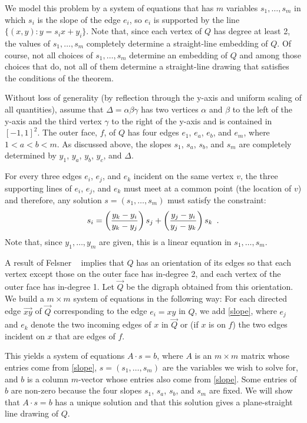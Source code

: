 \documentclass{patmorin}
\begin{document}
We model this problem by a system of equations that has $m$ variables
$s_1,\ldots,s_m$ in which $s_i$ is the slope of the edge $e_i$, so $e_i$
is supported by the line $\{(x,y):y=s_ix + y_i\}$.  Note that, since
each vertex of $Q$ has degree at least 2, the values of $s_1,\ldots,s_m$
completely determine a straight-line embedding of $Q$.  Of course,
not all choices of $s_1,\ldots,s_m$ determine an embedding of $Q$ and
among those choices that do, not all of them determine a straight-line
drawing that satisfies the conditions of the theorem.

Without loss of generality (by reflection through the y-axis and uniform
scaling of all quantities), assume that $\Delta=\alpha\beta\gamma$
has two vertices $\alpha$ and $\beta$ to the left of the y-axis and
the third vertex $\gamma$ to the right of the y-axis and is contained
in $[-1,1]^2$.  The outer face, $f$, of $Q$ has four edges $e_1$, $e_a$,
$e_b$, and $e_m$, where $1 < a < b < m$.  As discussed above, the slopes
$s_1$, $s_a$, $s_b$, and $s_m$ are completely determined by $y_1$, $y_a$,
$y_b$, $y_c$, and $\Delta$.

For every three edges $e_i$, $e_j$, and $e_k$ incident on the same
vertex $v$, the three supporting lines of $e_i$, $e_j$, and $e_k$
must meet at a common point (the location of $v$) and therefore,
any solution $s=(s_1,\ldots,s_m)$ must satisfy the constraint:
\begin{equation}\eqlabel{slope} 
    s_i = \left(\frac{y_k-y_i}{y_k-y_j}\right) s_j 
          + \left(\frac{y_j-y_i}{y_j-y_k}\right)s_k \enspace .
\end{equation}
Note that, since $y_1,\ldots,y_m$ are given, this is a linear equation
in $s_1,\ldots,s_m$.

A result of Felsner \etal\ \cite[Lemma~2.7]{felsner.huemer.ea:binary}
implies that $Q$ has an orientation of its edges so that each vertex
except those on the outer face has in-degree 2, and each vertex of the
outer face has in-degree 1.  Let $\vec{Q}$ be the digraph obtained
from this orientation. We build a $m\times m$ system of equations
in the following way: For each directed edge $\vec{xy}$ of $\vec{Q}$
corresponding to the edge $e_i=xy$ in $Q$, we add \eqref{slope}, where
$e_j$ and $e_k$ denote the two incoming edges of $x$ in $\vec{Q}$ or
(if $x$ is on $f$) the two edges incident on $x$ that are edges of $f$.

This yields a system of equations $A\cdot s = b$, where $A$ is an $m\times
m$ matrix whose entries come from \eqref{slope}, $s=(s_1,\ldots,s_m)$
are the variables we wish to solve for, and $b$ is a column $m$-vector
whose entries also come from \eqref{slope}.  Some entries of $b$ are
non-zero because the four slopes $s_1$, $s_a$, $s_b$, and $s_m$ are fixed.
We will show that $A\cdot s=b$ has a unique solution and that this solution
gives a plane-straight line drawing of $Q$.
\end{document}
